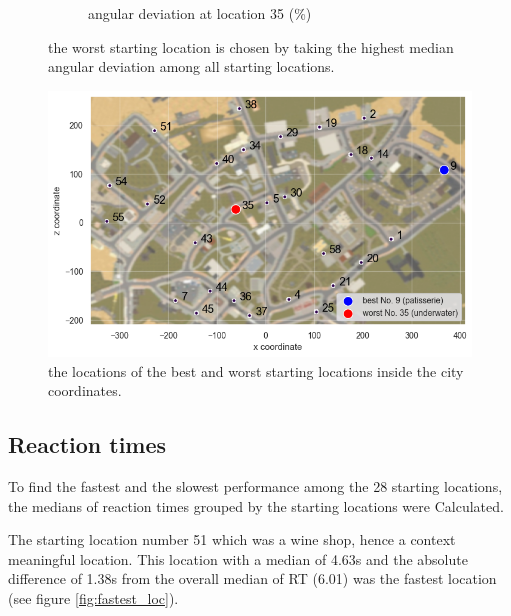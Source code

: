 \begin{figure}[!htb]
\begin{subfigure}[b]{0.48\linewidth}
		\caption{angular deviation at location 35 (\%)}
		\label{fig:worst_angular_dist_35}
	\end{subfigure}

	\caption[Worst starting location based on angular deviation]{the worst starting location is chosen by taking the highest median angular deviation among all starting locations.}
\end{figure}
\label{fig:worst_location}

\begin{figure}[!htb]
	\centering
	\includegraphics[width=140mm]{figures/best_worst_starting_locations_map.png}
	\caption[Locations of best and worst starting locations in city]{the locations of the best and worst starting locations inside the city coordinates.}
	\label{fig:best_worst_locs}
\end{figure}


\subsection{Reaction times}

To find the fastest and the slowest performance among the 28 starting locations, the medians of reaction times grouped by the starting locations were Calculated.

The starting location number 51 which was a wine shop, hence a context meaningful location. This location with a median of 4.63s and the absolute difference of 1.38s from the overall median of RT (6.01) was the fastest location (see figure \ref{fig:fastest_loc}).


